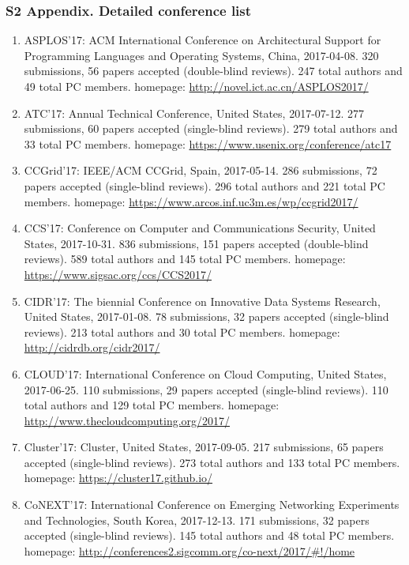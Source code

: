 \documentclass[10pt,letterpaper]{article}
\begin{document}
\hypertarget{s2-detailed-conference-list}{%
\subsubsection*{S2 Appendix. Detailed conference list}\label{s2-detailed-conference-list}}

\begin{enumerate}
\item ASPLOS'17: ACM International Conference on Architectural Support for Programming Languages and Operating Systems, China, 2017-04-08. 320  submissions, 56 papers accepted (double-blind reviews). 247 total authors and 49 total PC members. homepage: \url{http://novel.ict.ac.cn/ASPLOS2017/}
\item ATC'17: Annual Technical Conference, United States, 2017-07-12. 277  submissions, 60 papers accepted (single-blind reviews). 279 total authors and 33 total PC members. homepage: \url{https://www.usenix.org/conference/atc17}
\item CCGrid'17: IEEE/ACM CCGrid, Spain, 2017-05-14. 286  submissions, 72 papers accepted (single-blind reviews). 296 total authors and 221 total PC members. homepage: \url{https://www.arcos.inf.uc3m.es/wp/ccgrid2017/}
\item CCS'17: Conference on Computer and Communications Security, United States, 2017-10-31. 836  submissions, 151 papers accepted (double-blind reviews). 589 total authors and 145 total PC members. homepage: \url{https://www.sigsac.org/ccs/CCS2017/}
\item CIDR'17: The biennial Conference on Innovative Data Systems Research, United States, 2017-01-08. 78  submissions, 32 papers accepted (single-blind reviews). 213 total authors and 30 total PC members. homepage: \url{http://cidrdb.org/cidr2017/}
\item CLOUD'17: International Conference on Cloud Computing, United States, 2017-06-25. 110  submissions, 29 papers accepted (single-blind reviews). 110 total authors and 129 total PC members. homepage: \url{http://www.thecloudcomputing.org/2017/}
\item Cluster'17: Cluster, United States, 2017-09-05. 217  submissions, 65 papers accepted (single-blind reviews). 273 total authors and 133 total PC members. homepage: \url{https://cluster17.github.io/}
\item CoNEXT'17: International Conference on Emerging Networking Experiments and Technologies, South Korea, 2017-12-13. 171  submissions, 32 papers accepted (single-blind reviews). 145 total authors and 48 total PC members. homepage: \url{http://conferences2.sigcomm.org/co-next/2017/#!/home}

\end{enumerate}
\end{document}
